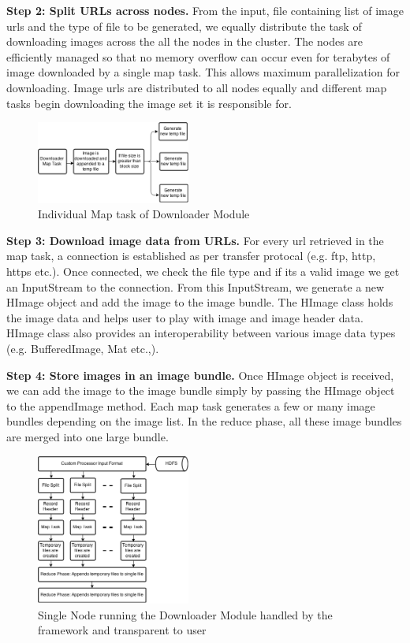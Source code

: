 \documentclass[conference]{IEEEtran}
\begin{document}
\textbf{Step 2: Split URLs across nodes.}
From the input, file containing list of image urls and the type of file to be generated, we equally distribute the task of downloading images across the all the nodes in the cluster. The nodes are efficiently managed so that no memory overflow can occur even for terabytes of image downloaded by a single map task. This allows maximum parallelization for downloading. Image urls are distributed to all nodes equally and different map tasks begin downloading the image set it is responsible for.

\begin{figure}[h]
	\centering
	\includegraphics[width=0.45\textwidth]{down-map}
	\caption{Individual Map task of Downloader Module}
	\label{fig:down-map}
\end{figure}

\textbf{Step 3: Download image data from URLs.}
For every url retrieved in the map task, a connection is established as per transfer protocal (e.g. ftp, http, https etc.). Once connected, we check the file type and if its a valid image we get an InputStream to the connection. From this InputStream, we generate a new HImage object and add the image to the image bundle. The HImage class holds the image data and helps user to play with image and image header data. HImage class also provides an interoperability between various image data types (e.g. BufferedImage, Mat etc.,).

\textbf{ Step 4: Store images in an image bundle. } 
Once HImage object is received, we can add the image to the image bundle simply by passing the HImage object to the appendImage method. Each map task generates a few or many image bundles depending on the image list. In the reduce phase, all these image bundles are merged into one large bundle.

\begin{figure}[h]
	\centering
	\includegraphics[width=0.45\textwidth]{down-node}
	\caption{Single Node running the Downloader Module handled by the framework and transparent to user}
	\label{fig:down-node}
\end{figure}
\end{document}
